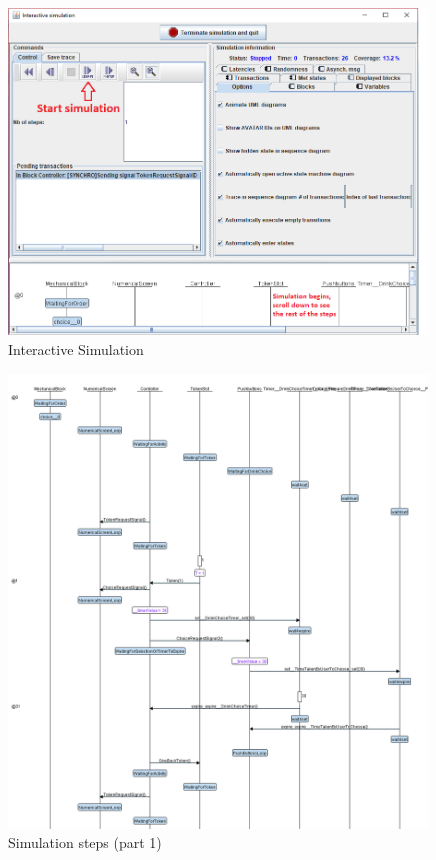 \documentclass[12pt]{article}
\begin{document}
\begin{figure}[htbp]
\centering
\includegraphics[width=0.99\textwidth]{fig/interactivesim.png}
\caption{Interactive Simulation} \label{fig:interactivesim}
\end{figure}

\begin{figure}[htbp]
\centering
\includegraphics[width=0.99\textwidth]{fig/simstep1.png}
\caption{Simulation steps (part 1)} \label{fig:simstep1}
\end{figure}
\end{document}
